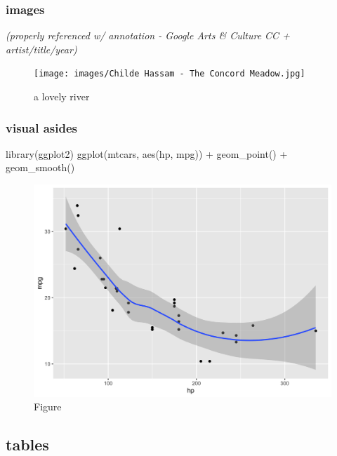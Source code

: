 \documentclass[
]{article}
\newenvironment{Shaded}{\begin{snugshade}}{\end{snugshade}}
\newcommand{\FunctionTok}[1]{\textcolor[rgb]{0.00,0.00,0.00}{#1}}
\newcommand{\NormalTok}[1]{#1}
\newcommand{\SpecialCharTok}[1]{\textcolor[rgb]{0.00,0.00,0.00}{#1}}
\begin{document}
\hypertarget{images}{%
\subsubsection{images}\label{images}}

\emph{(properly referenced w/ annotation - Google Arts \& Culture CC +
artist/title/year)}

\begin{figure}
\hypertarget{river}{%
\centering
\texttt{[image: images/Childe Hassam - The Concord Meadow.jpg]}
\caption{a lovely river}\label{river}
}
\end{figure}

\hypertarget{visual-asides}{%
\subsubsection{visual asides}\label{visual-asides}}

\begin{Shaded}
\begin{Highlighting}[]
\FunctionTok{library}\NormalTok{(ggplot2)}
\FunctionTok{ggplot}\NormalTok{(mtcars, }\FunctionTok{aes}\NormalTok{(hp, mpg)) }\SpecialCharTok{+} \FunctionTok{geom\_point}\NormalTok{() }\SpecialCharTok{+} \FunctionTok{geom\_smooth}\NormalTok{()}
\end{Highlighting}
\end{Shaded}

\begin{figure}
\centering
\includegraphics{figures/unnamed-chunk-5-1.png}
\caption{Figure}
\end{figure}

\hypertarget{tables}{%
\subsection{tables}\label{tables}}
\end{document}
